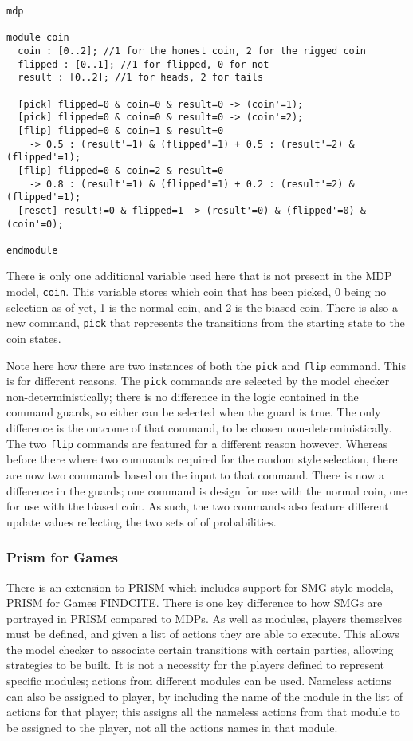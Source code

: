 \documentclass{l4proj}
\begin{document}
\begin{verbatim}
mdp

module coin
  coin : [0..2]; //1 for the honest coin, 2 for the rigged coin
  flipped : [0..1]; //1 for flipped, 0 for not
  result : [0..2]; //1 for heads, 2 for tails

  [pick] flipped=0 & coin=0 & result=0 -> (coin'=1);
  [pick] flipped=0 & coin=0 & result=0 -> (coin'=2);
  [flip] flipped=0 & coin=1 & result=0 
    -> 0.5 : (result'=1) & (flipped'=1) + 0.5 : (result'=2) & (flipped'=1);
  [flip] flipped=0 & coin=2 & result=0 
    -> 0.8 : (result'=1) & (flipped'=1) + 0.2 : (result'=2) & (flipped'=1);
  [reset] result!=0 & flipped=1 -> (result'=0) & (flipped'=0) & (coin'=0);
	
endmodule
\end{verbatim}

There is only one additional variable used here that is not present in the MDP model, {\tt coin}. This variable stores which coin that has been picked, 0 being no selection as of yet, 1 is the normal coin, and 2 is the biased coin. There is also a new command, {\tt pick} that represents the transitions from the starting state to the coin states.

Note here how there are two instances of both the {\tt pick} and {\tt flip} command. This is for different reasons. The {\tt pick} commands are selected by the model checker non-deterministically; there is no difference in the logic contained in the command guards, so either can be selected when the guard is true. The only difference is the outcome of that command, to be chosen non-deterministically.\\
The two {\tt flip} commands are featured for a different reason however. Whereas before there where two commands required for the random style selection, there are now two commands based on the input to that command. There is now a difference in the guards; one command is design for use with the normal coin, one for use with the biased coin. As such, the two commands also feature different update values reflecting the two sets of of probabilities.


\subsubsection{Prism for Games}
There is an extension to PRISM which includes support for SMG style models, PRISM for Games {FINDCITE}.
There is one key difference to how SMGs are portrayed in PRISM compared to MDPs. As well as modules, players themselves must be defined, and given a list of actions they are able to execute. This allows the model checker to associate certain transitions with certain parties, allowing strategies to be built. It is not a necessity for the players defined to represent specific modules; actions from different modules can be used. Nameless actions can also be assigned to player, by including the name of the module in the list of actions for that player; this assigns all the nameless actions from that module to be assigned to the player, not all the actions names in that module.
\end{document}
